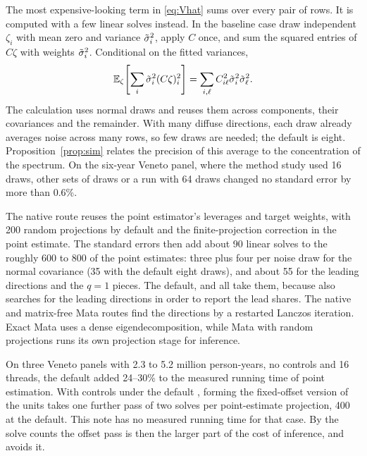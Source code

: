 The most expensive-looking term in \eqref{eq:Vhat} sums over every pair of
rows. It is computed with a few linear solves instead. In the baseline
case draw independent $\zeta_i$ with mean zero and variance $\tilde\sigma_i^2$, apply
$C$ once, and sum the squared entries of $C\zeta$ with weights $\tilde\sigma_i^2$.
Conditional on the fitted variances,
\begin{equation}\label{eq:sim}
 \mathbb{E}_\zeta\!\left[\sum_i\tilde\sigma_i^2(C\zeta)_i^2\right]
      =\sum_{i,\ell}C_{i\ell}^2\tilde\sigma_i^2\tilde\sigma_\ell^2 .
\end{equation}
The calculation uses normal draws and reuses them across components, their
covariances and the remainder. With many diffuse directions, each draw
already averages noise across many rows, so few draws are needed; the default is
eight. Proposition~\ref{prop:sim} relates the precision of this average to the
concentration of the spectrum. On the six-year Veneto panel, where the method study
used 16 draws, other sets of draws or a run with 64 draws changed no standard error by
more than 0.6\%.

The native route reuses the point estimator's leverages and target weights,
with 200 random projections by default and the finite-projection correction
in the point estimate. The standard errors then add about 90 linear solves to the
roughly 600 to 800 of the point estimates: three plus four per noise draw for the
normal covariance (35 with the default eight draws), and about 55 for the leading
directions and the $q=1$ pieces. The default,  and
 all take them, because
 also searches for the leading directions in order to report
the lead shares. The native and matrix-free Mata routes find the directions by a
restarted Lanczos iteration. Exact Mata uses a dense eigendecomposition, while Mata
with random projections runs its own projection stage for inference.

On three Veneto panels with 2.3 to 5.2 million person-years, no controls and 16
threads, the default added 24--30\% to the measured running time of point estimation.
With controls under the default , forming the fixed-offset
version of the units takes one further pass of two solves per point-estimate
projection, 400 at the default. This note has no measured running time for that case.
By the
solve counts the offset pass is then the larger part of the cost of inference, and
 avoids it.
